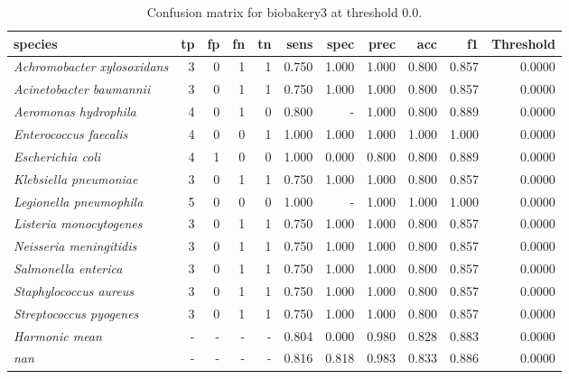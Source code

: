 \begin{table}[H]
\centering
\begin{tabular}{lrrrrrrrrrr}
\hline
\textbf{species} & \textbf{tp} & \textbf{fp} & \textbf{fn} & \textbf{tn} & \textbf{sens} & \textbf{spec} & \textbf{prec} & \textbf{acc} & \textbf{f1} & \textbf{Threshold} \\
\hline
\itshape Achromobacter xylosoxidans & 3 & 0 & 1 & 1 & 0.750 & 1.000 & 1.000 & 0.800 & 0.857 & 0.0000 \\
\itshape Acinetobacter baumannii & 3 & 0 & 1 & 1 & 0.750 & 1.000 & 1.000 & 0.800 & 0.857 & 0.0000 \\
\itshape Aeromonas hydrophila & 4 & 0 & 1 & 0 & 0.800 & - & 1.000 & 0.800 & 0.889 & 0.0000 \\
\itshape Enterococcus faecalis & 4 & 0 & 0 & 1 & 1.000 & 1.000 & 1.000 & 1.000 & 1.000 & 0.0000 \\
\itshape Escherichia coli & 4 & 1 & 0 & 0 & 1.000 & 0.000 & 0.800 & 0.800 & 0.889 & 0.0000 \\
\itshape Klebsiella pneumoniae & 3 & 0 & 1 & 1 & 0.750 & 1.000 & 1.000 & 0.800 & 0.857 & 0.0000 \\
\itshape Legionella pneumophila & 5 & 0 & 0 & 0 & 1.000 & - & 1.000 & 1.000 & 1.000 & 0.0000 \\
\itshape Listeria monocytogenes & 3 & 0 & 1 & 1 & 0.750 & 1.000 & 1.000 & 0.800 & 0.857 & 0.0000 \\
\itshape Neisseria meningitidis & 3 & 0 & 1 & 1 & 0.750 & 1.000 & 1.000 & 0.800 & 0.857 & 0.0000 \\
\itshape Salmonella enterica & 3 & 0 & 1 & 1 & 0.750 & 1.000 & 1.000 & 0.800 & 0.857 & 0.0000 \\
\itshape Staphylococcus aureus & 3 & 0 & 1 & 1 & 0.750 & 1.000 & 1.000 & 0.800 & 0.857 & 0.0000 \\
\itshape Streptococcus pyogenes & 3 & 0 & 1 & 1 & 0.750 & 1.000 & 1.000 & 0.800 & 0.857 & 0.0000 \\
\itshape Harmonic mean & - & - & - & - & 0.804 & 0.000 & 0.980 & 0.828 & 0.883 & 0.0000 \\
\itshape nan & - & - & - & - & 0.816 & 0.818 & 0.983 & 0.833 & 0.886 & 0.0000 \\
\end{tabular}
\caption{Confusion matrix for biobakery3 at threshold 0.0.}
\label{tab:conf_biobakery3_0.0}
\end{table}
